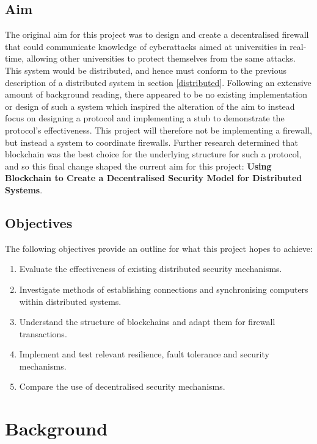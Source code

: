 \documentclass[a4paper, 11pt]{report}
\begin{document}
\section{Aim} \label{aim}
The original aim for this project was to design and create a decentralised firewall that could communicate knowledge of cyberattacks aimed at universities in real-time, allowing other universities to protect themselves from the same attacks. This system would be distributed, and hence must conform to the previous description of a distributed system in section \ref{distributed}. Following an extensive amount of background reading, there appeared to be no existing implementation or design of such a system which inspired the alteration of the aim to instead focus on designing a protocol and implementing a \gls{stub} to demonstrate the protocol's effectiveness. This project will therefore not be implementing a firewall, but instead a system to coordinate firewalls. Further research determined that \gls{blockchain} was the best choice for the underlying structure for such a protocol, and so this final change shaped the current aim for this project: \textbf{Using Blockchain to Create a Decentralised Security Model for Distributed Systems}.

\section{Objectives}
The following objectives provide an outline for what this project hopes to achieve:

\begin{enumerate}
    \item Evaluate the effectiveness of existing distributed security mechanisms.
    \item Investigate methods of establishing connections and synchronising computers within distributed systems.
    \item Understand the structure of \gls{blockchain}s and adapt them for firewall transactions.
    \item Implement and test relevant resilience, fault tolerance and security mechanisms.
    \item Compare the use of decentralised security mechanisms.
\end{enumerate}

\chapter{Background}
\end{document}
